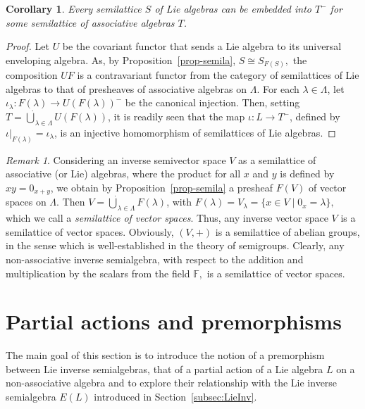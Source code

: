 \documentclass[10pt,a4paper]{amsart}
\newtheorem{cor}[thm]{Corollary}
\theoremstyle{definition}
\theoremstyle{remark}
\newtheorem{rem}[thm]{Remark}
\numberwithin{equation}{section}
\newtheorem*{Theorem A}{\textbf{Theorem A}}
\newtheorem*{Corollary E}{\textbf{Corollary E}}
\newtheorem*{Corollary F}{\textbf{Corollary F}}
\newtheorem*{Theorem B}{\textbf{Theorem B}}
\newtheorem*{Theorem C}{\textbf{Theorem C}}
\newtheorem*{Theorem D}{\textbf{Theorem B}}
\newtheorem*{p a}{\textbf{Proof of  Theorem A}}
\newtheorem*{p b}{\textbf{Proof of Theorem B}}
\newtheorem*{p c}{\textbf{Proof of  Theorem C}}
\newtheorem*{p d}{\textbf{Proof of  Theorem D}}
\newcommand{\F}{\mathbb{F}}
\newcommand{\0}{{\vartheta}}
\begin{document}
\begin{cor}\label{c: semillatice}
Every semilattice $S$ of Lie algebras can be embedded into $T^-$ for some semilattice of associative algebras $T$. 
\end{cor}
\begin{proof}
Let $U$ be the covariant functor that sends a Lie algebra to its universal enveloping algebra. As, by Proposition~\ref{prop-semila}, 
 $S\cong S_{F(S)},$ 
the composition $UF$ is a contravariant functor
from the category of semilattices of Lie algebras to that of presheaves  of associative algebras on $\Lambda .$
For each $\lambda\in \Lambda$, let $\iota_\lambda:F(\lambda)\to U(F(\lambda))^-$ be the canonical injection. Then, setting
 $T=
\dot{\bigcup}_{\lambda\in \Lambda} U(F(\lambda))$, it is readily seen   that  the map $\iota:L\to T^-$, defined by $\iota|_{F(\lambda)}=\iota_\lambda$, is an injective homomorphism of semilattices of Lie algebras. 
\end{proof}


\begin{rem}Considering an inverse semivector space $V$ as a semilattice of associative (or Lie) algebras, where the product for all $x$ and $y$ is defined by $xy=0_{x+y}$, we obtain by Proposition~\ref{prop-semila} a presheaf $F(V)$ of vector spaces on $\Lambda .$  Then 
 $V=
\dot{\bigcup}_{\lambda\in \Lambda} F(\lambda)$, with
$F(\lambda )= V_{\lambda}=\{ x\in V\mid 0_x=\lambda\},$ which we call a {\it semilattice of vector spaces}. Thus,  any inverse vector  space $V$ is a semilattice of vector spaces. Obviously,  $(V,+)$  is a semilattice 
of abelian groups, in the sense which is well-established in the theory of semigroups. Clearly, any
non-associative  inverse semialgebra, with respect to the addition and multiplication by the scalars from the field $\F ,$ is a  semilattice of vector spaces.
\end{rem}


\section{Partial actions and premorphisms}\label{s: partial actions}
The main goal of this section is to introduce the notion   of a premorphism between Lie inverse  semialgebras,  that of a partial action of a Lie algebra $L$ on a non-associative algebra and to explore their relationship with the Lie inverse semialgebra \( E(L) \) introduced in  Section~\ref{subsec:LieInv}. 
\end{document}
